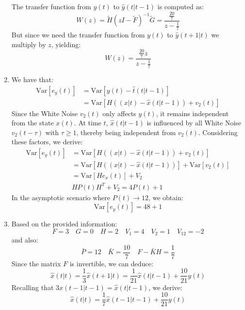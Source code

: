 \begin{enumerate}
        The transfer function from $y(t)$ to $\hat{y}(t|t-1)$ is computed as: 
        \[W(z)=\tilde{H}(zI-\tilde{F})^{-1}\tilde{G}=\dfrac{\frac{20}{7}}{z-\frac{1}{7}}\]
        But since we need the transfer function from $y(t)$ to $\hat{y}(t+1|t)$ we multiply by $z$, yielding: 
        \[W(z)=\dfrac{\frac{20}{7}z}{z-\frac{1}{7}}\]
    \item We have that: 
        \begin{align*}
            \text{Var}[e_y(t)]  &=\text{Var}\left[y(t)-\hat{t}(t|t-1)\right] \\
                                &=\text{Var}\left[H\left((x|t)-\hat{x}(t|t-1)\right)+v_2(t)\right]
        \end{align*}
        Since the White Noise $v_2(t)$ only affects $y(t)$, it remains independent from the state $x(t)$.
        At time $t$, $\hat{x}(t|t-1)$ is influenced by all White Noise $v_2(t-\tau)$ with $\tau \geq 1$, thereby being independent from $v_2(t)$. 
        Considering these factors, we derive:
        \begin{align*}
            \text{Var}[e_y(t)]  &=\text{Var}\left[H\left((x|t)-\hat{x}(t|t-1)\right)+v_2(t)\right] \\ 
                                &=\text{Var}\left[H\left((x|t)-\hat{x}(t|t-1)\right)\right]+\text{Var}\left[v_2(t)\right] \\
                                &=\text{Var}\left[He_x(t)\right]+V_2 \\
                                &HP(t)H^{T}+V_2 =4P(t)+1
        \end{align*}
        In the asymptotic scenario where $P(t)\rightarrow 12$, we obtain:
        \[\text{Var}[e_y(t)]=48+1\]
    \item Based on the provided information:
        \[F=3 \quad G=0 \quad H=2 \quad V_1=4 \quad V_2=1 \quad V_{12}=-2\]
        and also:
        \[\bar{P}=12 \quad \bar{K}=\dfrac{10}{7} \quad F-\bar{K}H=\dfrac{1}{7}\]
        Since the matrix $F$ is invertible, we can deduce:
        \[\hat{x}(t|t)=\dfrac{1}{3}\hat{x}(t+1|t)=\dfrac{1}{21}\hat{x}(t|t-1)+\dfrac{10}{21}y(t)\]
        Recalling that $3\hat{x}(t-1|t-1)=\hat{x}(t|t-1)$, we derive: 
        \[\hat{x}(t|t)=\dfrac{1}{7}\hat{x}(t-1|t-1)+\dfrac{10}{21}y(t)\]
\end{enumerate}